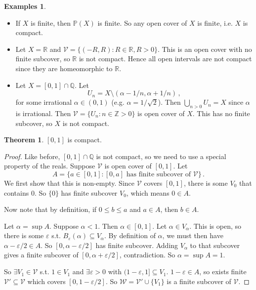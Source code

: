 \documentclass[a4paper,11pt]{article}
\theoremstyle{definition}
\newtheorem*{exs}{Examples}
\newtheorem*{thm}{Theorem}
\numberwithin{equation}{section}
\begin{document}
\begin{exs}
\leavevmode
\begin{itemize}
    \item If $X$ is finite, then $\mathbb{P}(X)$ is finite. So any open cover of $X$ is finite, i.e. $X$ is compact.
    \item Let $X=\mathbb{R}$ and $\mathcal{V}=\{(-R,R):R\in\mathbb{R},R>0\}$. This is an open cover with no finite subcover, so $\mathbb{R}$ is not compact. Hence all open intervals are not compact since they are homeomorphic to $\mathbb{R}$.
    \item Let $X=[0,1]\cap\mathbb{Q}$. Let
    \begin{equation}
        U_n=X\setminus(\alpha-1/n,\alpha+1/n)\,,
    \end{equation}
    for some irrational $\alpha\in(0,1)$ (e.g. $\alpha=1/\sqrt{2}$). Then $\bigcup_{n>0}U_n=X$ since $\alpha$ is irrational. Then $\mathcal{V}=\{U_n:n\in\mathbb{Z}>0\}$ is open cover of $X$. This has no finite subcover, so $X$ is not compact.
\end{itemize}
\end{exs}

\begin{thm}
$[0,1]$ is compact.
\end{thm}

\begin{proof}
Like before, $[0,1]\cap\mathbb{Q}$ is not compact, so we need to use a special property of the reals. Suppose $\mathcal{V}$ is open cover of $[0,1]$. Let
\begin{equation}
    A=\{a\in[0,1]:[0,a]\text{ has finite subcover of }\mathcal{V}\}\,.
\end{equation}
We first show that this is non-empty. Since $\mathcal{V}$ covers $[0,1]$, there is some $V_0$ that contains $0$. So $\{0\}$ has finite subcover $V_0$, which means $0\in A$.

Now note that by definition, if $0\leq b\leq a$ and $a\in A$, then $b\in A$. 

Let $\alpha=\sup A$. Suppose $\alpha<1$. Then $\alpha\in[0,1]$. Let $\alpha\in V_\alpha$. This is open, so there is some $\varepsilon$ s.t. $B_\varepsilon(\alpha)\subseteq V_\alpha$. By definition of $\alpha$, we must then have $\alpha-\varepsilon/2\in A$. So $[0,\alpha-\varepsilon/2]$ has finite subcover. Adding $V_\alpha$ to that subcover gives a finite subcover of $[0,\alpha+\varepsilon/2]$, contradiction. So $\alpha=\sup A=1$.

So $\exists V_1\in\mathcal{V}$ s.t. $1\in V_1$ and $\exists\varepsilon>0$ with $(1-\varepsilon,1]\subseteq V_1$. $1-\varepsilon\in A$, so exists finite $\mathcal{V}'\subseteq\mathcal{V}$ which covers $[0,1-\varepsilon/2]$. So $\mathcal{W}=\mathcal{V}'\cup \{V_1\}$ is a finite subcover of $\mathcal{V}$.
\end{proof}
\end{document}

